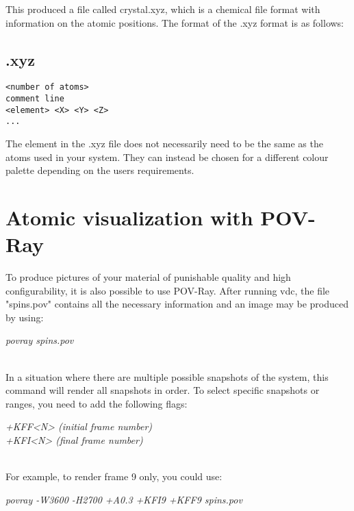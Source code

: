 This produced a file called crystal.xyz, which is a chemical file format with information on the atomic positions. The format of the .xyz format is as follows:\\

\subsection*{.xyz}
{\footnotesize
\begin{verbatim}
<number of atoms>
comment line
<element> <X> <Y> <Z>
...
\end{verbatim}
}

The element in the .xyz file does not necessarily need to be the same as the atoms used in your system. They can instead be chosen for a different colour palette depending on the users requirements.  

\section*{Atomic visualization with POV-Ray}

To produce pictures of your material of punishable quality and high configurability, it is also possible to use POV-Ray. After running vdc, the file "spins.pov" contains all the necessary information and an image may be produced by using:

\begin{minipage}[c]{\textwidth}
\centering
\textit{povray spins.pov}
\end{minipage}\\

In a situation where there are multiple possible snapshots of the system, this command will render all snapshots in order. To select specific snapshots or ranges, you need to add the following flags:

\begin{minipage}[c]{\textwidth}
\centering
\textit{+KFF<N> (initial frame number)\\
+KFI<N> (final frame number)}
\end{minipage}\\

For example, to render frame 9 only, you could use:

\begin{minipage}[c]{\textwidth}
\centering
\textit{povray -W3600 -H2700 +A0.3 +KFI9 +KFF9 spins.pov}
\end{minipage}\\

